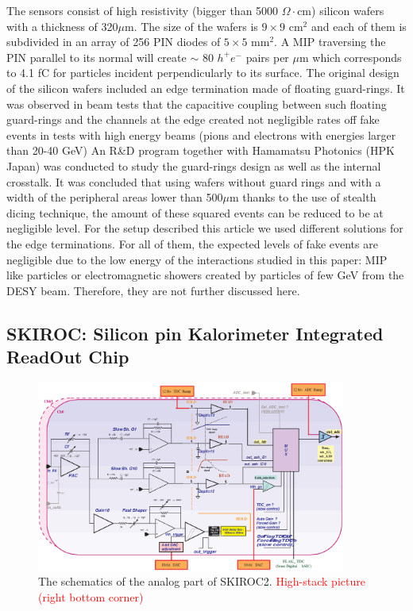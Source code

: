 \documentclass[a4paper,11pt]{article}
\newcommand{\todo}[1]{\textcolor{red}{{#1}}}
\begin{document}
The sensors consist of high resistivity (bigger than 5000 $\Omega\cdot$cm)
silicon wafers with a thickness of 320$\mu$m.
The size of the wafers is $9\times9$ cm$^{2}$ and each of them is subdivided in an array of 256 PIN diodes of $5\times5$ mm$^{2}$.
A MIP traversing the PIN parallel to its normal will create $\sim$ 80 $h^{+}e^{-}$ pairs per $\mu$m which corresponds to 4.1 fC
for particles incident perpendicularly to its surface.
The original design of the silicon wafers included an edge termination made of floating guard-rings.
It was observed in beam tests \cite{Cornat:2015eoa,Cornat:2009zz} that the capacitive coupling between such floating guard-rings 
and the channels at the edge created not negligible rates off fake
events in tests with high energy beams (pions and electrons with energies larger than 20-40 GeV)
An R\&D program together with Hamamatsu Photonics (HPK Japan) was conducted to study the guard-rings design 
as well as the internal crosstalk. It was concluded that using wafers without guard rings and with a width of the peripheral areas lower than 
500$\mu$m thanks to the use of stealth dicing technique, the amount of these squared events 
can be reduced to be at negligible level.
For the setup described this article we used different solutions for the edge terminations.
For all of them, the expected levels of fake events are negligible due to
the low energy of the interactions studied in this paper:
MIP like particles or electromagnetic showers created by particles of few GeV
from the DESY beam. Therefore, they are not further discussed here.

\subsection{SKIROC: Silicon pin Kalorimeter Integrated ReadOut Chip}
\label{sec:skiroc}

\begin{figure}[!ht]
  \centering
    \includegraphics[width=4in]{../figs/skiroc2_block.eps}
\caption{The schematics of the analog part of SKIROC2. \todo{High-stack picture (right bottom corner)}}
\label{SKIROC2}
\end{figure}
\end{document}
